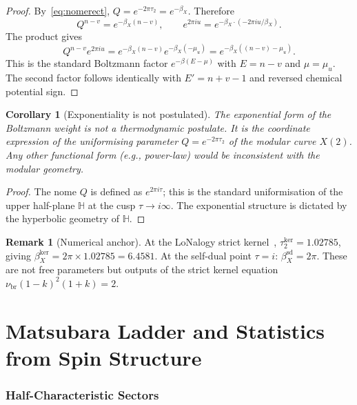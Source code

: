 \documentclass[12pt]{article}
\theoremstyle{plain}
\newtheorem{corollary}[theorem]{Corollary}
\theoremstyle{definition}
\newtheorem{remark}[theorem]{Remark}
\numberwithin{equation}{section}
\newcommand{\HH}{\mathbb{H}}
\newcommand{\br}{\mathrm{br}}
\newcommand{\kker}{\mathrm{ker}}
\begin{document}
\begin{proof}
By~\eqref{eq:nomerect}, $Q=e^{-2\pi\tau_2}=e^{-\beta_X}$.  Therefore
\begin{equation}
Q^{n-v} = e^{-\beta_X(n-v)},\qquad
e^{2\pi iu} = e^{-\beta_X\cdot(-2\pi iu/\beta_X)}.
\end{equation}
The product gives
\begin{equation}
Q^{n-v}e^{2\pi iu}
= e^{-\beta_X(n-v)}e^{-\beta_X(-\mu_u)}
= e^{-\beta_X((n-v)-\mu_u)}.
\end{equation}
This is the standard Boltzmann factor $e^{-\beta(E-\mu)}$ with
$E=n-v$ and $\mu=\mu_u$.  The second factor follows identically
with $E'=n+v-1$ and reversed chemical potential sign.
\end{proof}

\begin{corollary}[Exponentiality is not postulated]
The exponential form of the Boltzmann weight is not a thermodynamic
postulate.  It is the coordinate expression of the uniformising
parameter $Q=e^{-2\pi\tau_2}$ of the modular curve $X(2)$.  Any
other functional form (e.g., power-law) would be inconsistent with
the modular geometry.
\end{corollary}

\begin{proof}
The nome $Q$ is defined as $e^{2\pi i\tau}$; this is the standard
uniformisation of the upper half-plane $\HH$ at the cusp $\tau\to i\infty$.
The exponential structure is dictated by the hyperbolic geometry of $\HH$.
\end{proof}

\begin{remark}[Numerical anchor]
At the LoNalogy strict kernel~\cite{YMmassGap},
$\tau_2^{\kker}=1.02785$, giving
$\beta_X^{\kker}=2\pi\times1.02785=6.4581$.
At the self-dual point $\tau=i$: $\beta_X^{\mathrm{sd}}=2\pi$.
These are not free parameters but outputs of the strict kernel
equation $\nu_{\br}(1-k)^2(1+k)=2$.
\end{remark}


\part{Matsubara Ladder and Statistics from Spin Structure}

\section{Half-Characteristic Sectors}\label{sec:matsubara}
\end{document}
